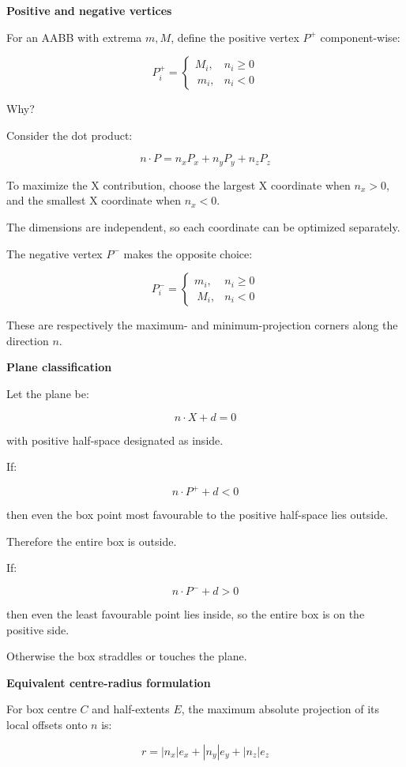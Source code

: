 \textbf{Positive and negative vertices}

For an AABB with extrema \(m,M\), define the positive vertex \(P^+\) component-wise:

\[
\boxed{ P_i^+= \begin{cases} M_i,&n_i\ge0\\\ m_i,&n_i<0 \end{cases} }
\]

Why?

Consider the dot product:

\[
n\cdot P=n_xP_x+n_yP_y+n_zP_z
\]

To maximize the X contribution, choose the largest X coordinate when \(n_x>0\), and the smallest X coordinate when \(n_x<0\).

The dimensions are independent, so each coordinate can be optimized separately.

The negative vertex \(P^-\) makes the opposite choice:

\[
\boxed{ P_i^-= \begin{cases} m_i,&n_i\ge0\\\ M_i,&n_i<0 \end{cases} }
\]

These are respectively the maximum- and minimum-projection corners along the direction \(n\).

\textbf{Plane classification}

Let the plane be:

\[
n\cdot X+d=0
\]

with positive half-space designated as inside.

If:

\[
n\cdot P^++d<0
\]

then even the box point most favourable to the positive half-space lies outside.

Therefore the entire box is outside.

If:

\[
n\cdot P^-+d>0
\]

then even the least favourable point lies inside, so the entire box is on the positive side.

Otherwise the box straddles or touches the plane.

\textbf{Equivalent centre-radius formulation}

For box centre \(C\) and half-extents \(E\), the maximum absolute projection of its local offsets onto \(n\) is:

\[
\boxed{ r=|n_x|e_x+|n_y|e_y+|n_z|e_z }
\]

